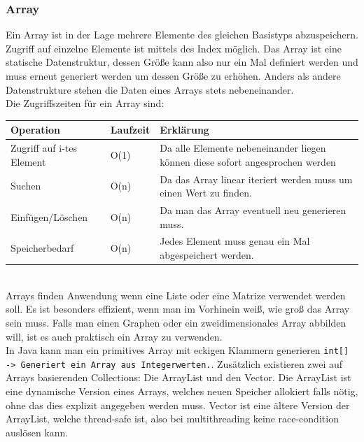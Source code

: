 \documentclass{article}
\begin{document}
	\subsubsection{Array}
	Ein Array ist in der Lage mehrere Elemente des gleichen Basistyps abzuspeichern. Zugriff auf einzelne Elemente ist mittels des Index möglich. Das Array ist eine statische Datenstruktur, dessen Größe kann also nur ein Mal definiert werden und muss erneut generiert werden um dessen Größe zu erhöhen. Anders als andere Datenstrukture stehen die Daten eines Arrays stets nebeneinander. \\
	Die Zugriffszeiten für ein Array sind: \\
	\begin{tabular}{| l | l | l |}
		\toprule
		Operation & Laufzeit & Erklärung \\ \midrule
		Zugriff auf i-tes Element & O(1) & Da alle Elemente nebeneinander liegen können diese sofort angesprochen werden \\ \hline
		Suchen & O(n) & Da das Array linear iteriert werden muss um einen Wert zu finden. \\ \hline
		Einfügen/Löschen & O(n) & Da man das Array eventuell neu generieren muss. \\ \hline
		Speicherbedarf & O(n) & Jedes Element muss genau ein Mal abgespeichert werden.\\
		\bottomrule
	\end{tabular} \\
	Arrays finden Anwendung wenn eine Liste oder eine Matrize verwendet werden soll. Es ist besonders effizient, wenn man im Vorhinein weiß, wie groß das Array sein muss. Falls man einen Graphen oder ein zweidimensionales Array abbilden will, ist es auch praktisch ein Array zu verwenden. \\
	In Java kann man ein primitives Array mit eckigen Klammern generieren \texttt{int[] -> Generiert ein Array aus Integerwerten.}. Zusätzlich existieren zwei auf Arrays basierenden Collections: Die ArrayList und den Vector. Die ArrayList ist eine dynamische Version eines Arrays, welches neuen Speicher allokiert falls nötig, ohne das dies explizit angegeben werden muss. Vector ist eine ältere Version der ArrayList, welche thread-safe ist, also bei multithreading keine race-condition auslösen kann. \\
\end{document}
